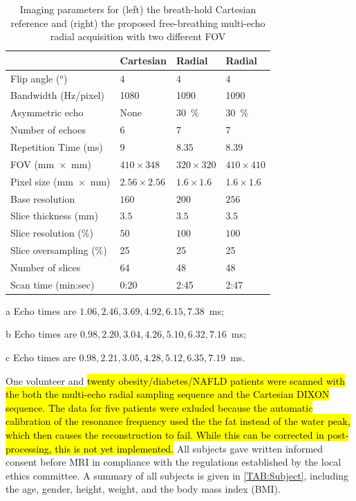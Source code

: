 \documentclass[journal,twoside,web]{ieeecolor}
\begin{document}
\begin{table}
	\begin{threeparttable}
		\caption{Imaging parameters for (left) the breath-hold Cartesian reference 
			and (right) the proposed free-breathing multi-echo radial acquisition 
			with two different FOV}
		\label{TAB:Protocol}
		\setlength{\tabcolsep}{3pt}
		\begin{tabular}{m{} m{} m{} m{}}
			\toprule
			& Cartesian & Radial & Radial \\
			\hline
			Flip angle ($^o$) & $4$ & $4$ & $4$ \\
			Bandwidth (Hz/pixel) & 1080 & 1090 & 1090 \\
			Asymmetric echo & None & \SI{30}{\percent} & \SI{30}{\percent} \\
			Number of echoes & 6\tnote{a} & 7\tnote{b} & 7\tnote{c} \\
			Repetition Time (\si{\milli\second}) & $9$ & $8.35$ & $8.39$ \\
			FOV (mm~$\times$~mm) & $410 \times 348$ & $320 \times 320$ & $410 \times 410$ \\
			Pixel size (mm~$\times$~mm) & $2.56 \times 2.56$ & $1.6 \times 1.6$ & $1.6 \times 1.6$ \\
			Base resolution & $160$ & $200$ & $256$ \\
			Slice thickness (\si{\milli\meter}) & $3.5$ & $3.5$ & $3.5$ \\
			Slice resolution (\si{\percent}) & $50$ & $100$ & $100$ \\
			Slice oversampling (\si{\percent}) & 25 & 25 & 25 \\
			Number of slices & 64 & 48 & 48 \\
			Scan time (min:sec) & 0:20 & 2:45 & 2:47 \\
			\bottomrule
		\end{tabular}
		\begin{tablenotes}
			\item[a] Echo times are $1.06, 2.46, 3.69, 4.92, 6.15, 7.38$~ms;
			\item[b] Echo times are $0.98, 2.20, 3.04, 4.26, 5.10, 6.32, 7.16$~ms;
			\item[c] Echo times are $0.98, 2.21, 3.05, 4.28, 5.12, 6.35, 7.19$~ms.
		\end{tablenotes}
	\end{threeparttable}
\end{table}


One volunteer and \hl{twenty obesity/diabetes/NAFLD patients were scanned
with the both the multi-echo radial sampling sequence and the Cartesian
DIXON sequence. The data for five patients were exluded because the
automatic calibration of the resonance frequency used the the fat
instead of the water peak, which then causes the reconstruction to fail.
While this can be corrected in post-processing, this is not yet
implemented.}
All subjects gave written informed consent before MRI 
in compliance with the regulations established by the local ethics committee. 
A summary of all subjects is given in \cref{TAB:Subject}, 
including the age, gender, height, weight, and the body mass index (BMI).
\end{document}

